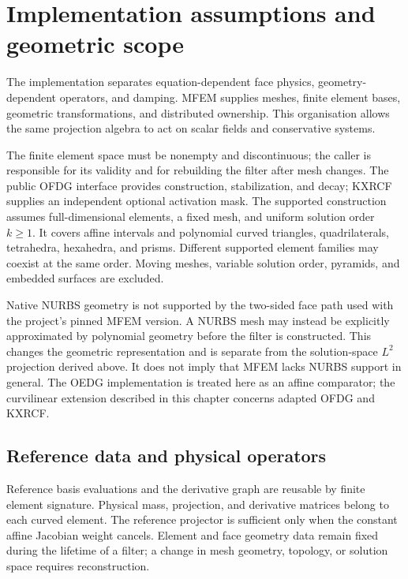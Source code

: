 \section{Implementation assumptions and geometric scope}
\label{chap:implementation}
\label{sec:ofdg-implementation}
\label{sec:support-boundary}
The implementation separates equation-dependent face physics, geometry-dependent
operators, and damping. MFEM supplies meshes, finite element bases, geometric
transformations, and distributed ownership. This organisation allows the same
projection algebra to act on scalar fields and conservative systems.

The finite element space must be nonempty and discontinuous; the caller is
responsible for its validity and for rebuilding the filter after mesh changes.
The public OFDG interface provides construction, stabilization, and decay;
KXRCF supplies an independent optional activation mask.
The supported construction assumes full-dimensional elements, a fixed mesh,
and uniform solution order $k\geq1$. It covers affine intervals and polynomial
curved triangles, quadrilaterals, tetrahedra, hexahedra, and prisms. Different
supported element families may coexist at the same order. Moving meshes,
variable solution order, pyramids, and embedded surfaces are excluded.

Native NURBS geometry is not supported by the two-sided face path used with
the project's pinned MFEM version. A NURBS mesh may instead be explicitly
approximated by polynomial geometry before the filter is constructed. This
changes the geometric representation and is separate from the solution-space
$L^2$ projection derived above. It does not imply that MFEM lacks NURBS support
in general. The OEDG implementation is treated here as an affine comparator;
the curvilinear extension described in this chapter concerns adapted OFDG
and KXRCF.

\subsection{Reference data and physical operators}
\label{sec:curved-construction}
Reference basis evaluations and the derivative graph are reusable by finite
element signature. Physical mass, projection, and derivative matrices belong
to each curved element. The reference projector is sufficient only when the
constant affine Jacobian weight cancels. Element and face geometry data remain
fixed during the lifetime of a filter; a change in mesh geometry, topology, or
solution space requires reconstruction.

